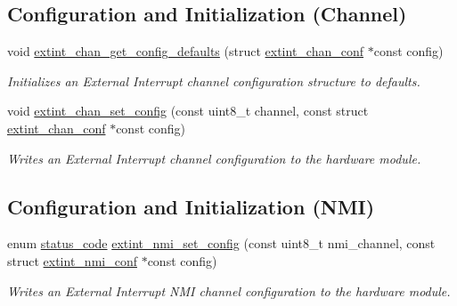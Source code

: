 \subsection*{Configuration and Initialization (Channel)}
\begin{DoxyCompactItemize}
\item 
void \mbox{\hyperlink{group__asfdoc__sam0__extint__group_gab6dc4e3c3c0c85f96c52c130f3b63241}{extint\+\_\+chan\+\_\+get\+\_\+config\+\_\+defaults}} (struct \mbox{\hyperlink{structextint__chan__conf}{extint\+\_\+chan\+\_\+conf}} $\ast$const config)
\begin{DoxyCompactList}\small\item\em Initializes an External Interrupt channel configuration structure to defaults. \end{DoxyCompactList}\item 
void \mbox{\hyperlink{group__asfdoc__sam0__extint__group_gace11f1168aa706f9b40f6c4d65b402a0}{extint\+\_\+chan\+\_\+set\+\_\+config}} (const uint8\+\_\+t channel, const struct \mbox{\hyperlink{structextint__chan__conf}{extint\+\_\+chan\+\_\+conf}} $\ast$const config)
\begin{DoxyCompactList}\small\item\em Writes an External Interrupt channel configuration to the hardware module. \end{DoxyCompactList}\end{DoxyCompactItemize}
\subsection*{Configuration and Initialization (N\+MI)}
\begin{DoxyCompactItemize}
\item 
enum \mbox{\hyperlink{group__group__sam0__utils__status__codes_ga751c892e5a46b8e7d282085a5a5bf151}{status\+\_\+code}} \mbox{\hyperlink{group__asfdoc__sam0__extint__group_gae6d52d3a6437598ebf56f2ad75193033}{extint\+\_\+nmi\+\_\+set\+\_\+config}} (const uint8\+\_\+t nmi\+\_\+channel, const struct \mbox{\hyperlink{structextint__nmi__conf}{extint\+\_\+nmi\+\_\+conf}} $\ast$const config)
\begin{DoxyCompactList}\small\item\em Writes an External Interrupt N\+MI channel configuration to the hardware module. \end{DoxyCompactList}\end{DoxyCompactItemize}
